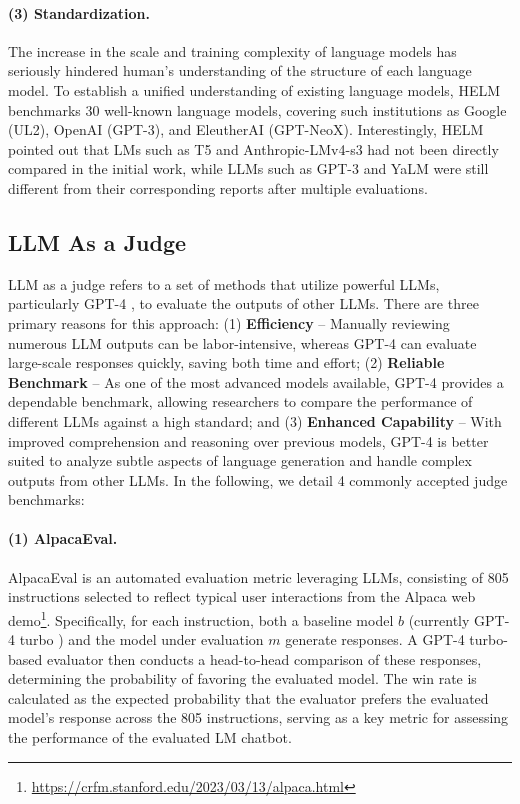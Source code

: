 \documentclass[11pt]{article}
\begin{document}
\paragraph{(3) Standardization.} The increase in the scale and training complexity of language models has seriously hindered human's understanding of the structure of each language model. To establish a unified understanding of existing language models, HELM benchmarks 30 well-known language models, covering such institutions as Google (UL2\cite{tay2022ul2}), OpenAI (GPT-3\cite{Brown2020LanguageMA}), and EleutherAI (GPT-NeoX\cite{Black2022GPTNeoX20BAO}). Interestingly, HELM pointed out that LMs such as T5 \cite{Raffel2019ExploringTL} and Anthropic-LMv4-s3 \cite{bai2022training} had not been directly compared in the initial work, while LLMs such as GPT-3 and YaLM were still different from their corresponding reports after multiple evaluations. 



\subsection{LLM As a Judge}

LLM as a judge refers to a set of methods that utilize powerful LLMs, particularly GPT-4 \cite{OpenAI2023GPT4TR}, to evaluate the outputs of other LLMs.
There are three primary reasons for this approach: (1) \textbf{Efficiency} – Manually reviewing numerous LLM outputs can be labor-intensive, whereas GPT-4 can evaluate large-scale responses quickly, saving both time and effort; (2) \textbf{Reliable Benchmark} – As one of the most advanced models available, GPT-4 provides a dependable benchmark, allowing researchers to compare the performance of different LLMs against a high standard; and (3) \textbf{Enhanced Capability} – With improved comprehension and reasoning over previous models, GPT-4 is better suited to analyze subtle aspects of language generation and handle complex outputs from other LLMs.
In the following, we detail 4 commonly accepted judge benchmarks:

\paragraph{(1) AlpacaEval.}
AlpacaEval \cite{alpaca_eval} is an automated evaluation metric leveraging LLMs, consisting of 805 instructions selected to reflect typical user interactions from the Alpaca web demo\footnote{\url{https://crfm.stanford.edu/2023/03/13/alpaca.html}}. Specifically, for each instruction, both a baseline model $b$ (currently GPT-4 turbo \cite{OpenAI2023GPT4TR}) and the model under evaluation $m$ generate responses. A GPT-4 turbo-based evaluator then conducts a head-to-head comparison of these responses, determining the probability of favoring the evaluated model. The win rate is calculated as the expected probability that the evaluator prefers the evaluated model's response across the 805 instructions, serving as a key metric for assessing the performance of the evaluated LM chatbot.
\end{document}
